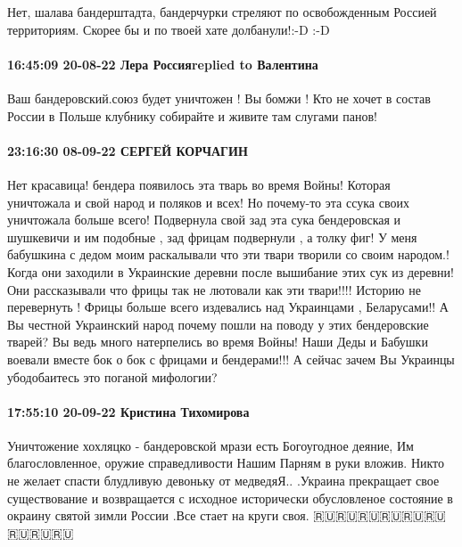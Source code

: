 Нет, шалава бандерштадта, бандерчурки стреляют по освобожденным Россией территориям.
Скорее бы и по твоей хате долбанули!:-D :-D

\paragraph{16:45:09 20-08-22 Лера Россияreplied to Валентина}

Ваш бандеровский.союз будет уничтожен ! Вы бомжи ! Кто не хочет в состав России
в Польше клубнику собирайте и живите там слугами панов!

\paragraph{23:16:30 08-09-22 СЕРГЕЙ КОРЧАГИН}

Нет красавица! бендера появилось эта тварь во время Войны! Которая уничтожала и
свой народ и поляков и всех! Но почему-то эта ссука своих уничтожала больше
всего! Подвернула свой зад эта сука бендеровская и шушкевичи и им подобные ,
зад фрицам подвернули , а толку фиг! У меня бабушкина с дедом моим раскалывали
что эти твари творили со своим народом.! Когда они заходили в Украинские
деревни после вышибание этих сук из деревни! Они рассказывали что фрицы так не
лютовали как эти твари!!!! Историю не перевернуть ! Фрицы больше всего
издевались над Украинцами , Беларусами!! А Вы честной Украинский народ почему
пошли на поводу у этих бендеровские тварей? Вы ведь много натерпелись во время
Войны! Наши Деды и Бабушки воевали вместе бок о бок с фрицами и бендерами!!! А
сейчас зачем Вы Украинцы убодобаитесь это поганой мифологии?

\paragraph{17:55:10 20-09-22 Кристина Тихомирова}

Уничтожение хохляцко - бандеровской мрази есть Богоугодное деяние, Им благословленное, оружие справедливости Нашим Парням в руки вложив.
Никто не желает спасти блудливую девоньку от медведяЯ.. .Украина прекращает свое существование и возвращается с исходное исторически обусловленое состояние в окраину святой зимли России
.Все стает на круги своя.
🇷🇺🇷🇺🇷🇺🇷🇺🇷🇺🇷🇺🇷🇺🇷🇺🇷🇺


